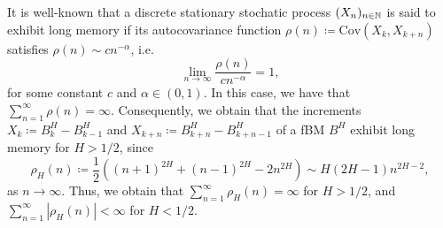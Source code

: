 It is well-known that a discrete stationary stochatic process $(X_{n})_{n\in \mathbb{N}}$ is said to exhibit long memory if its autocovariance function $\rho(n)\coloneqq \textrm{Cov}(X_{k},X_{k+n})$ satisfies $\rho(n)\sim cn^{-\alpha}$, i.e.
\begin{equation}
    \lim_{n\to \infty}\frac{\rho(n)}{cn^{-\alpha}}=1,
\end{equation}
for some constant $c$ and $\alpha \in (0,1)$. In this case, we have that $\sum_{n=1}^{\infty}\rho(n)=\infty$. Consequently, we obtain that the increments $X_{k}\coloneqq B^{H}_{k}-B^{H}_{k-1}$ and $X_{k+n}\coloneqq B^{H}_{k+n}-B^{H}_{k+n-1}$ of a fBM $B^H$ exhibit long memory for $H>1/2$, since 
\begin{equation}\label{asymp}
    \rho_{H}(n)\coloneqq \frac{1}{2}\left((n+1)^{2H}+(n-1)^{2H}-2n^{2H}\right) \sim H(2H-1)n^{2H-2},
\end{equation}
as $n\to \infty$. Thus, we obtain that $\sum_{n=1}^{\infty}\rho_{H}(n)=\infty$ for $H>1/2$, and $\sum_{n=1}^{\infty}|\rho_{H}(n)|<\infty$ for $H<1/2$.
